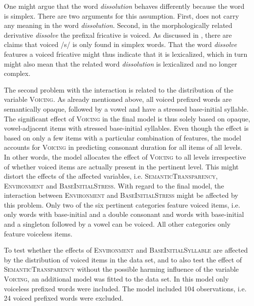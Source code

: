 One might argue that the word \textit{dissolution} behaves differently because the word is simplex. There are two arguments for this assumption. First,  does not carry any meaning in the word \textit{dissolution}. Second, in the morphologically related derivative \textit{dissolve} the prefixal fricative is voiced. As discussed in , there are claims that voiced /s/ is only found in simplex words. That the word \textit{dissolve} features a voiced fricative might thus indicate that it is lexicalized, which in turn might also mean that the related word \textit{dissolution} is lexicalized and no longer complex.

The second problem with the interaction  
is related to the distribution of the variable \textsc{Voicing}. 
 As already mentioned above, all voiced prefixed words are semantically opaque, followed by a vowel and have a stressed base-initial syllable. The significant effect of \textsc{Voicing} in the final model is thus solely based on opaque, vowel-adjacent items with stressed base-initial syllables. Even though the effect is based on only a few items with a particular combination of features, the model accounts for \textsc{Voicing} in predicting consonant duration for all items of all levels. In other words, the model allocates the effect of \textsc{Voicing} to all levels irrespective of whether voiced items are actually present in the pertinent level. This might distort the effects of the affected variables, i.e. \textsc{SemanticTransparency}, \textsc{Environment} and \textsc{BaseInitialStress}. 
  With regard to the final model, the interaction between \textsc{Environment} and \textsc{BaseInitialStress} might be affected by this problem.
  Only two of the six pertinent categories feature voiced items, i.e. only words with base-initial  and a double consonant and words with base-initial  and a singleton followed by a vowel can be voiced. All other categories only feature voiceless items.
  
  
  
  To test whether the effects of \textsc{Environment} and \textsc{BaseInitialSyllable} are affected by the distribution of voiced items in the data set, and to also test the effect of \textsc{SemanticTransparency} without the possible harming influence of the variable \textsc{Voicing}, an additional model was fitted to the data set. In this model only voiceless prefixed words were included. The model included 104 observations, i.e. 24 voiced prefixed words were excluded.\largerpage[-1]
  

